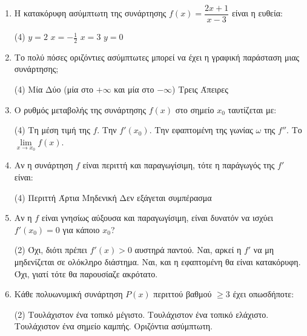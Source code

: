 \begin{enumerate}[label=\textbf{2.\arabic*.}, itemsep=4mm]
    \item Η κατακόρυφη ασύμπτωτη της συνάρτησης $f(x) = \dfrac{2x+1}{x-3}$ είναι η ευθεία:
    \begin{tasks}[label=\let\textdexiakeraia\relax\alph*.](4)
        \task $y = 2$
        \task $x = -\frac{1}{2}$
        \task $x = 3$
        \task $y = 0$
    \end{tasks}

    \item Το πολύ πόσες οριζόντιες ασύμπτωτες μπορεί να έχει η γραφική παράσταση μιας συνάρτησης;
    \begin{tasks}[label=\let\textdexiakeraia\relax\alph*.](4)
        \task Μία
        \task Δύο (μία στο $+\infty$ και μία στο $-\infty$)
        \task Τρεις
        \task Άπειρες
    \end{tasks}

    \item Ο ρυθμός μεταβολής της συνάρτησης $f(x)$ στο σημείο $x_0$ ταυτίζεται με:
    \begin{tasks}[label=\let\textdexiakeraia\relax\alph*.](4)
        \task Τη μέση τιμή της $f$.
        \task Την $f'(x_0)$.
        \task Την εφαπτομένη της γωνίας $\omega$ της $f''$.
        \task Το $\lim\limits_{x \to x_0} f(x)$.
    \end{tasks}

    \item Αν η συνάρτηση $f$ είναι περιττή και παραγωγίσιμη, τότε η παράγωγός της $f'$ είναι:
    \begin{tasks}[label=\let\textdexiakeraia\relax\alph*.](4)
        \task Περιττή
        \task Άρτια
        \task Μηδενική
        \task Δεν εξάγεται συμπέρασμα
    \end{tasks}

    \item Αν η $f$ είναι γνησίως αύξουσα και παραγωγίσιμη, είναι δυνατόν να ισχύει $f'(x_0) = 0$ για κάποιο $x_0$?
    \begin{tasks}[label=\let\textdexiakeraia\relax\alph*.](2)
        \task Όχι, διότι πρέπει $f'(x) > 0$ αυστηρά παντού.
        \task Ναι, αρκεί η $f'$ να μη μηδενίζεται σε ολόκληρο διάστημα.
        \task Ναι, και η εφαπτομένη θα είναι κατακόρυφη.
        \task Όχι, γιατί τότε θα παρουσίαζε ακρότατο.
    \end{tasks}

    \item Κάθε πολυωνυμική συνάρτηση $P(x)$ περιττού βαθμού $\ge 3$ έχει οπωσδήποτε:
    \begin{tasks}[label=\let\textdexiakeraia\relax\alph*.](2)
        \task Τουλάχιστον ένα τοπικό μέγιστο.
        \task Τουλάχιστον ένα τοπικό ελάχιστο.
        \task Τουλάχιστον ένα σημείο καμπής.
        \task Οριζόντια ασύμπτωτη.
    \end{tasks}


\end{enumerate}
